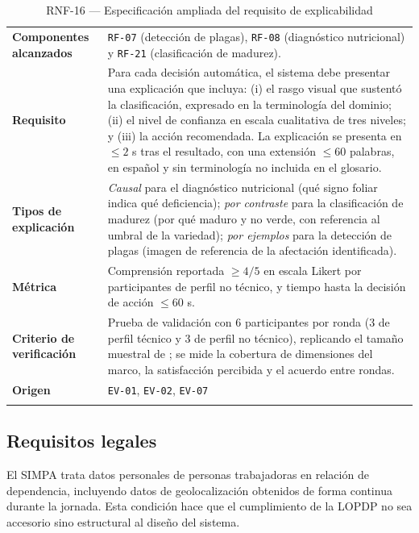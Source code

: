 \documentclass[11pt,a4paper]{article}
\newcommand{\id}[1]{\texttt{\begingroup\hyphenpenalty=10000\relax#1\endgroup}}
\renewcommand{\id}[1]{\texttt{#1}}
\begin{document}
\begin{longtable}{|L{3.4cm}|L{12.0cm}|}
\hline
{}\\
\hline
\textbf{Componentes alcanzados} & \id{RF-07} (detección de plagas), \id{RF-08} (diagnóstico nutricional) y \id{RF-21} (clasificación de madurez). \\ \hline
\textbf{Requisito} & Para cada decisión automática, el sistema debe presentar una explicación que incluya: (i) el rasgo visual que sustentó la clasificación, expresado en la terminología del dominio; (ii) el nivel de confianza en escala cualitativa de tres niveles; y (iii) la acción recomendada. La explicación se presenta en $\leq 2$ s tras el resultado, con una extensión $\leq 60$ palabras, en español y sin terminología no incluida en el glosario. \\ \hline
\textbf{Tipos de explicación} & \emph{Causal} para el diagnóstico nutricional (qué signo foliar indica qué deficiencia); \emph{por contraste} para la clasificación de madurez (por qué maduro y no verde, con referencia al umbral de la variedad); \emph{por ejemplos} para la detección de plagas (imagen de referencia de la afectación identificada). \\ \hline
\textbf{Métrica} & Comprensión reportada $\geq 4/5$ en escala Likert por participantes de perfil no técnico, y tiempo hasta la decisión de acción $\leq 60$ s. \\ \hline
\textbf{Criterio de verificación} & Prueba de validación con 6 participantes por ronda (3 de perfil técnico y 3 de perfil no técnico), replicando el tamaño muestral de \cite{chazette2022}; se mide la cobertura de dimensiones del marco, la satisfacción percibida y el acuerdo entre rondas. \\ \hline
\textbf{Origen} & \footnotesize \id{EV-01}, \id{EV-02}, \id{EV-07} \\ \hline
\caption{RNF-16 --- Especificación ampliada del requisito de explicabilidad}
\end{longtable}

\subsection{Requisitos legales}

El SIMPA trata datos personales de personas trabajadoras en relación de dependencia, incluyendo
datos de geolocalización obtenidos de forma continua durante la jornada. Esta condición hace que el
cumplimiento de la LOPDP \cite{lopdp} no sea accesorio sino estructural al diseño del sistema.
\end{document}
